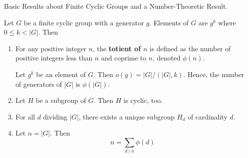 \documentclass[../../book.tex]{subfiles}
\begin{document}
\begin{lem} Basic Results about Finite Cyclic Groups and a Number-Theoretic Result.
    
    Let $G$ be a finite cyclic group with a generator $g$. 
    Elements of $G$ are $g^k$ where $0 \leq k < |G|$.
    Then \begin{enumerate}
        \item For any positive integer $n$, 
        the \textbf{totient of $n$} is defined as the number of positive integers 
        less than $n$ and coprime to $n$, denoted $\phi(n)$. 
        
        Let $g^k$ be an element of $G$. Then $o(g) = |G| / (|G|,k)$.
        Hence, the number of generators of $|G|$ is $\phi(|G|)$.
        
        \item Let $H$ be a subgroup of $G$. Then $H$ is cyclic, too. 
        \item For all $d$ dividing $|G|$,
        there exists a unique subgroup $H_d$ of cardinality $d$. 
        \item Let $n = |G|$. Then \[
            n = \sum_{d \mid n} \phi(d)
        \]
    \end{enumerate}
\end{lem}
\end{document}
